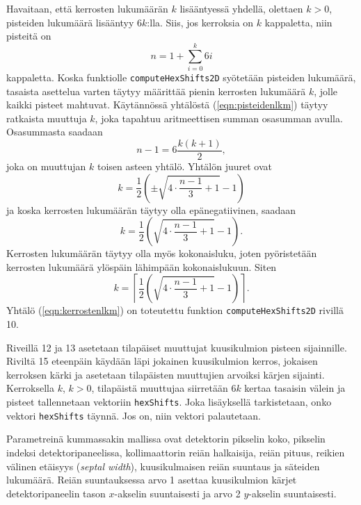 Havaitaan, että kerrosten lukumäärän $k$ lisääntyessä yhdellä, olettaen $k>0$, pisteiden lukumäärä lisääntyy $6k$:lla. Siis, jos kerroksia on $k$ kappaletta, niin pisteitä on
\begin{equation}\label{eqn:pisteidenlkm}
    n=1+\sum\limits_{i=0}^{k}6i
\end{equation}
kappaletta. Koska funktiolle \texttt{computeHexShifts2D} syötetään pisteiden lukumäärä, tasaista asettelua varten täytyy määrittää pienin kerrosten lukumäärä $k$, jolle kaikki pisteet mahtuvat. Käytännössä yhtälöstä (\ref{eqn:pisteidenlkm}) täytyy ratkaista muuttuja $k$, joka tapahtuu aritmeettisen summan osasumman\cite{harjulehto_analyysia_2022} avulla. Osasummasta saadaan
\begin{equation*}
    n-1=6\frac{k(k+1)}{2},
\end{equation*}
joka on muuttujan $k$ toisen asteen yhtälö. Yhtälön juuret ovat
\begin{equation*}
    k=\frac{1}{2}\left( \pm\sqrt{4\cdot\frac{n - 1}{3} + 1} - 1 \right)
\end{equation*}
ja koska kerrosten lukumäärän täytyy olla epänegatiivinen, saadaan
\begin{equation*}
    k=\frac{1}{2}\left( \sqrt{4\cdot\frac{n - 1}{3} + 1} - 1 \right).
\end{equation*}
Kerrosten lukumäärän täytyy olla myös kokonaisluku, joten pyöristetään kerrosten lukumäärä ylöspäin lähimpään kokonaislukuun. Siten
\begin{equation}\label{eqn:kerrostenlkm}
    k=\left\lceil\frac{1}{2}\left( \sqrt{4\cdot\frac{n - 1}{3} + 1} - 1 \right)\right\rceil.
\end{equation}
Yhtälö (\ref{eqn:kerrostenlkm}) on toteutettu funktion \texttt{computeHexShifts2D} rivillä 10.

Riveillä 12 ja 13 asetetaan tilapäiset muuttujat kuusikulmion pisteen sijainnille. Riviltä 15 eteenpäin käydään läpi jokainen kuusikulmion kerros, jokaisen kerroksen kärki ja asetetaan tilapäisten muuttujien arvoiksi kärjen sijainti. Kerroksella $k$, $k>0$, tilapäistä muuttujaa siirretään $6k$ kertaa tasaisin välein ja pisteet tallennetaan vektoriin \texttt{hexShifts}. Joka lisäyksellä tarkistetaan, onko vektori \texttt{hexShifts} täynnä. Jos on, niin vektori palautetaan.

Parametreinä kummassakin mallissa ovat detektorin pikselin koko, pikselin indeksi detektoripaneelissa, kollimaattorin reiän halkaisija, reiän pituus, reikien välinen etäisyys (\textit{septal width}), kuusikulmaisen reiän suuntaus ja säteiden lukumäärä. Reiän suuntauksessa arvo 1 asettaa kuusikulmion kärjet detektoripaneelin tason $x$-akselin suuntaisesti ja arvo 2 $y$-akselin suuntaisesti.

